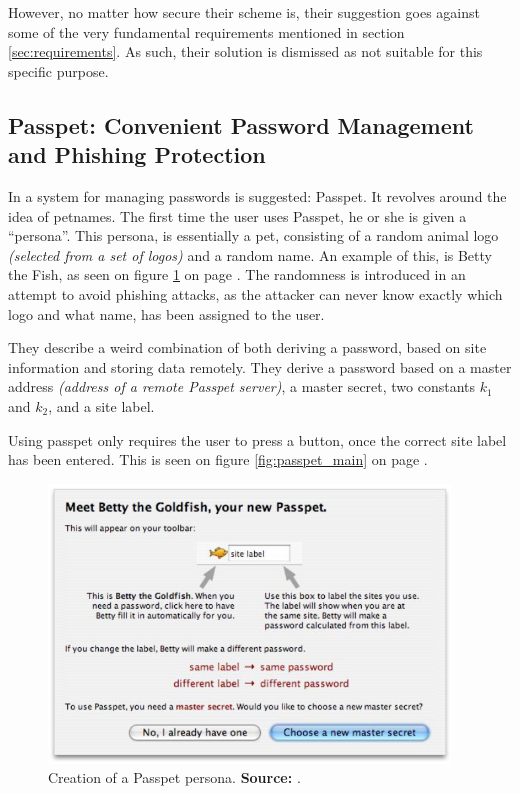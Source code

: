 			However, no matter how secure their scheme is, their suggestion goes against some of the very fundamental requirements mentioned in section \ref{sec:requirements}. As such, their solution is dismissed as not suitable for this specific purpose. 

		\subsection*{Passpet: Convenient Password Management and Phishing Protection}
			In \cite{passpet} a system for managing passwords is suggested: Passpet. It revolves around the idea of petnames. The first time the user uses Passpet, he or she is given a ``persona''. This persona, is essentially a pet, consisting of a random animal logo \emph{(selected from a set of logos)} and a random name. An example of this, is Betty the Fish, as seen on figure \ref{fig:passepet_persona} on page \pageref{fig:passepet_persona}. The randomness is introduced in an attempt to avoid phishing attacks, as the attacker can never know exactly which logo and what name, has been assigned to the user.

			They describe a weird combination of both deriving a password, based on site information and storing data remotely. They derive a password based on a master address \emph{(address of a remote Passpet server)}, a master secret, two constants $k_1$ and $k_2$, and a site label.

			Using passpet only requires the user to press a button, once the correct site label has been entered. This is seen on figure \ref{fig:passpet_main} on page \pageref{fig:passpet_main}.


			\begin{figure}[htbp]
				\centering
				\includegraphics[width=0.95\textwidth]{figures/analysis/passpet_persona.png}
				\caption{Creation of a Passpet persona. \textbf{Source:} \cite[p.4]{passpet}.}
				\label{fig:passepet_persona}
			\end{figure}

